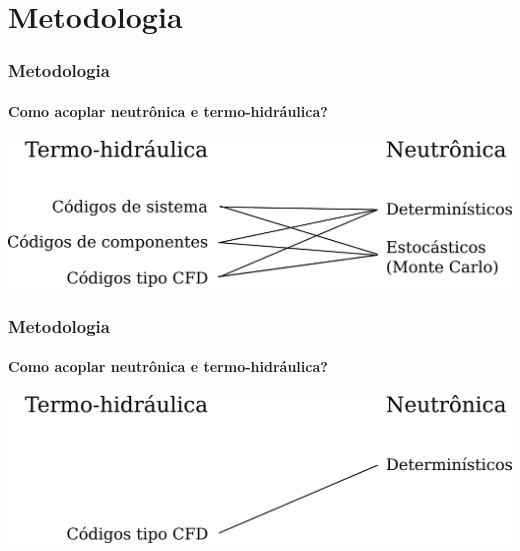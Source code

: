 \documentclass[svgnames,smaller,table]{beamer}
\begin{document}
\section{Metodologia}
\begin{frame}
  \frametitle{Metodologia}
  \framesubtitle{Como acoplar neutrônica e termo-hidráulica?}
  \includegraphics[scale=0.8]{../figuras/th-neu-1.png}
\end{frame}

\begin{frame}[noframenumbering]
  \frametitle{Metodologia}
  \framesubtitle{Como acoplar neutrônica e termo-hidráulica?}
  \includegraphics[scale=0.8]{../figuras/th-neu-4.png}
\end{frame}
\end{document}
